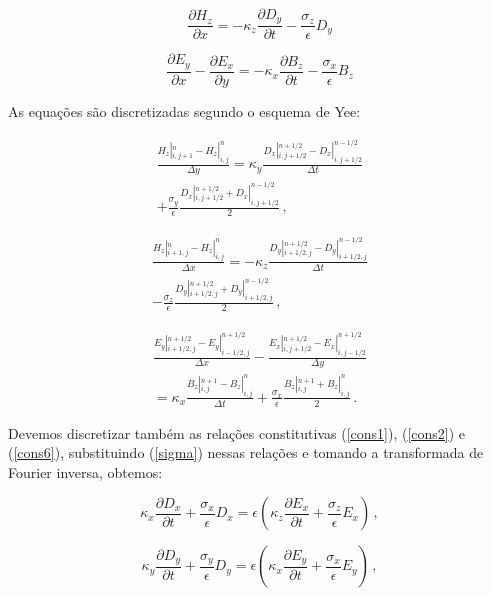 \documentclass[a4paper,10pt]{article}
\begin{document}
\begin{equation}
\dfrac{\partial H_z}{\partial x}=-\kappa_z\dfrac{\partial D_y}{\partial t}- \frac{\sigma_z}{\epsilon}D_y
\end{equation}

\begin{equation}
\dfrac{\partial E_y}{\partial x}-\dfrac{\partial E_x}{\partial y}=-\kappa_x\dfrac{\partial B_z}{\partial t}- \frac{\sigma_x}{\epsilon}B_z
\end{equation}

As equações são discretizadas segundo o esquema de Yee:

\begin{align}
\frac{H_z |_{i,j+1}^{n}-H_z |_{i,j}^{n}}{\Delta y}
= \kappa_y \frac{D_x |_{i,j+1/2}^{n+1/2}-D_x |_{i,j+1/2}^{n-1/2}}{\Delta t} \nonumber
\\+ \frac{\sigma_y}{\epsilon}\frac{D_x |_{i,j+1/2}^{n+1/2}+D_x |_{i,j+1/2}^{n-1/2}}{2}\,, \label{discr1}
\end{align}

\begin{align}
\frac{H_z |_{i+1,j}^{n}-H_z |_{i,j}^{n}}{\Delta x}
= - \kappa_z \frac{D_y |_{i+1/2,j}^{n+1/2}-D_y |_{i+1/2,j}^{n-1/2}}{\Delta t} \nonumber
\\ - \frac{\sigma_z}{\epsilon}\frac{D_y |_{i+1/2,j}^{n+1/2}+D_y |_{i+1/2,j}^{n-1/2}}{2}\,, \label{discr2}
\end{align}

\begin{align}
\frac{E_y |_{i+1/2,j}^{n+1/2}-E_y |_{i-1/2,j}^{n+1/2}}{\Delta x}
-\frac{E_x |_{i,j+1/2}^{n+1/2}-E_x |_{i,j-1/2}^{n+1/2}}{\Delta y} \nonumber
\\= \kappa_x \frac{ B_z |_{i,j}^{n+1}-B_z |_{i,j}^{n}}{\Delta t}
+ \frac{\sigma_x}{\epsilon}\frac{B_z |_{i,j}^{n+1}+B_z |_{i,j}^{n}}{2}\,. \label{discr3}
\end{align}


Devemos discretizar também as relações constitutivas (\ref{cons1}), (\ref{cons2}) e (\ref{cons6}), substituindo (\ref{sigma}) nessas relações e tomando a transformada de Fourier inversa, obtemos:

\begin{equation}
\kappa_x \dfrac{\partial D_x}{\partial t} + \frac{\sigma_x}{\epsilon}D_x=
\epsilon \left( \kappa_z \dfrac{\partial E_x}{\partial t} + \frac{\sigma_z}{\epsilon}E_x\right)\,,
\end{equation}

\begin{equation}
\kappa_y \dfrac{\partial D_y}{\partial t} + \frac{\sigma_y}{\epsilon}D_y=
\epsilon \left( \kappa_x \dfrac{\partial E_y}{\partial t} + \frac{\sigma_x}{\epsilon}E_y\right)\,,
\end{equation}
\end{document}
